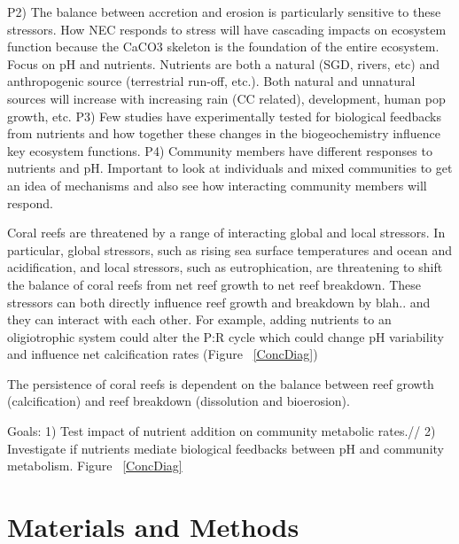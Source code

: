 \documentclass{article}%
\begin{document}
P2) The balance between accretion and erosion is particularly sensitive to these stressors. How NEC responds to stress will have cascading impacts on ecosystem function because the CaCO3 skeleton is the foundation of the entire ecosystem. Focus on pH and nutrients. Nutrients are both a natural (SGD, rivers, etc) and anthropogenic source (terrestrial run-off, etc.). Both natural and unnatural sources will increase with increasing rain (CC related), development, human pop growth, etc. 
P3) Few studies have experimentally tested for biological feedbacks from nutrients and how together these changes in the biogeochemistry influence key ecosystem functions.
P4) Community members have different responses to nutrients and pH. Important to look at individuals and mixed communities to get an idea of mechanisms and also see how interacting community members will respond.

Coral reefs are threatened by a range of interacting global and local stressors.  In particular, global stressors, such as rising sea surface temperatures and ocean and acidification, and local stressors, such as eutrophication, are threatening to shift the balance of coral reefs from net reef growth to net reef breakdown.  These stressors can both directly influence reef growth and breakdown by blah.. and they can interact with each other. For example, adding  nutrients to an oligiotrophic system could alter the P:R cycle which could change pH variability and influence net calcification rates (Figure ~\ref{ConcDiag})

The persistence of coral reefs is dependent on the balance between reef growth (calcification) and reef breakdown (dissolution and bioerosion).

Goals: 1) Test impact of nutrient addition on community metabolic rates.//
2) Investigate if nutrients mediate biological feedbacks between pH and community metabolism.
Figure ~\ref{ConcDiag}

\section{Materials and Methods}
\end{document}
